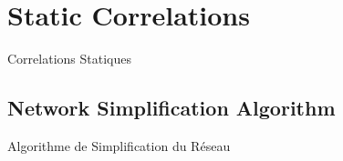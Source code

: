 





\section{Static Correlations}{Correlations Statiques}


\subsection{Network Simplification Algorithm}{Algorithme de Simplification du Réseau}




